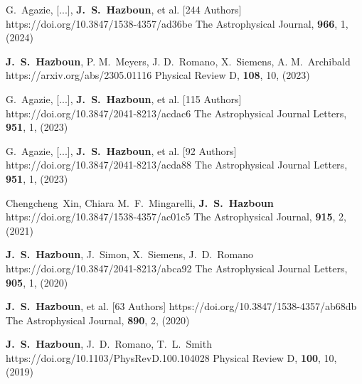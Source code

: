          {G.~{Agazie}, [...], \textbf{J.~S.~{Hazboun}}, et al. [244 Authors]}
         {https://doi.org/10.3847/1538-4357/ad36be}
         {{The Astrophysical Journal}, \textbf{966}, 1, (2024)}

         {\textbf{J.~S.~Hazboun}, P. M.~{Meyers}, J. D.~{Romano}, X.~{Siemens}, A. M.~{Archibald}}
         {https://arxiv.org/abs/2305.01116}
         {{Physical Review D}, \textbf{108}, 10, (2023)}

         {G.~{Agazie}, [...], \textbf{J.~S.~{Hazboun}}, et al. [115 Authors]}
         {https://doi.org/10.3847/2041-8213/acdac6}
         {{The Astrophysical Journal Letters}, \textbf{951}, 1, (2023)}

         {G.~{Agazie}, [...], \textbf{J.~S.~{Hazboun}}, et al. [92 Authors]}
         {https://doi.org/10.3847/2041-8213/acda88}
         {{The Astrophysical Journal Letters}, \textbf{951}, 1, (2023)}

         {Chengcheng~{Xin}, Chiara M.~F.~{Mingarelli}, \textbf{J.~S.~Hazboun}}
         {https://doi.org/10.3847/1538-4357/ac01c5}
         {{The Astrophysical Journal}, \textbf{915}, 2, (2021)}

         {\textbf{J.~S.~Hazboun}, J.~{Simon}, X.~{Siemens}, J.~D.~{Romano}}
         {https://doi.org/10.3847/2041-8213/abca92}
         {{The Astrophysical Journal Letters}, \textbf{905}, 1, (2020)}

         {\textbf{J.~S.~{Hazboun}}, et al. [63 Authors]}
         {https://doi.org/10.3847/1538-4357/ab68db}
         {{The Astrophysical Journal}, \textbf{890}, 2, (2020)}

         {\textbf{J.~S.~Hazboun}, J.~D.~{Romano}, T.~L.~{Smith}}
         {https://doi.org/10.1103/PhysRevD.100.104028}
         {{Physical Review D}, \textbf{100}, 10, (2019)}

